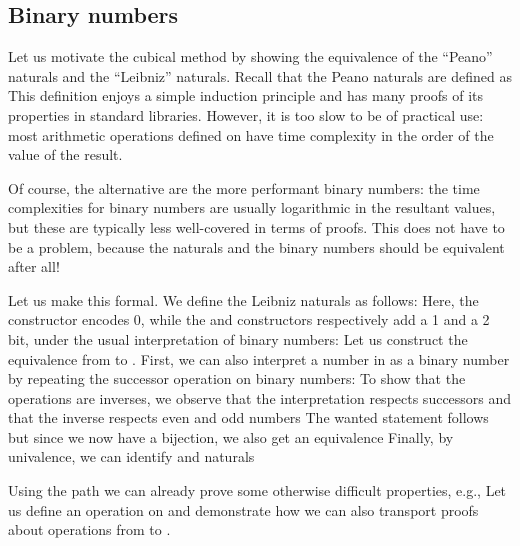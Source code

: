 \subsection{Binary numbers}\label{ssec:binary}
Let us motivate the cubical method by showing the equivalence of the ``Peano'' naturals and the ``Leibniz'' naturals. Recall that the Peano naturals are defined as 
This definition enjoys a simple induction principle and has many proofs of its properties in standard libraries. However, it is too slow to be of practical use: most arithmetic operations defined on \bN{} have time complexity in the order of the value of the result.

Of course, the alternative are the more performant binary numbers: the time complexities for binary numbers are usually logarithmic in the resultant values, but these are typically less well-covered in terms of proofs. This does not have to be a problem, because the \bN{} naturals and the binary numbers should be equivalent after all!

Let us make this formal. We define the Leibniz naturals as follows:
Here, the  constructor encodes 0, while the  and  constructors respectively add a 1 and a 2 bit, under the usual interpretation of binary numbers:
Let us construct the equivalence from \bN{} to \bL{}. First, we can also interpret a number in \bN{} as a binary number by repeating the successor operation on binary numbers:
To show that the operations are inverses, we observe that the interpretation respects successors
and that the inverse respects even and odd numbers
The wanted statement follows
but since we now have a bijection, we also get an equivalence
Finally, by univalence, we can identify \bN{} and \bL{} naturals

Using the path  we can already prove some otherwise difficult properties, e.g.,
Let us define an operation on \bL{} and demonstrate how we can also transport proofs about operations from \bN{} to \bL{}. 

